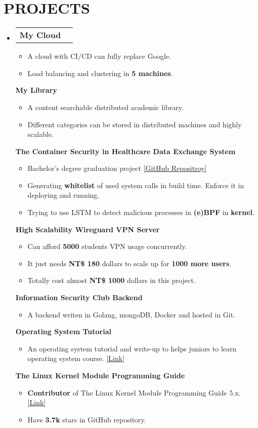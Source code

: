 \documentclass[letterpaper,11pt]{article}
\makeatletter
\newcommand{\resumeItem}[1]{
  \item\small{
    {#1 \vspace{-1pt}}
  }
}
\newcommand{\resumeProjectHeading}[2]{
    \item
    \begin{tabular*}{\textwidth}{l@{\extracolsep{\fill}}r}
      #1 & {\color{dark-grey}} \\
    \end{tabular*}\vspace{-4pt}
}
\newcommand{\resumeSubHeadingListStart}{\begin{itemize}[leftmargin=0in, label={}]}
\newcommand{\resumeSubHeadingListEnd}{\end{itemize}}
\newcommand{\resumeItemListStart}{\begin{itemize}}
\newcommand{\resumeItemListEnd}{\end{itemize}\vspace{0pt}}
\makeatother
\begin{document}

\section{PROJECTS}
\resumeSubHeadingListStart
\resumeProjectHeading

{\textbf{My Cloud}} {}
\resumeItemListStart
\resumeItem{A cloud with CI/CD can fully replace Google.}
\resumeItem{Load balancing and clustering in \textbf{5 machines}.}
\resumeItemListEnd

{\textbf{My Library}} {}
\resumeItemListStart
\resumeItem{A content searchable distributed academic library.}
\resumeItem{Different categories can be stored in distributed machines and highly scalable.}
\resumeItemListEnd

{\textbf{The Container Security in Healthcare Data Exchange System}} {}
\resumeItemListStart
\resumeItem{Bachelor’s degree graduation project \hspace{1pt} \href{https://github.com/25077667/Container_Security}{[GitHub Repositroy]}}
\resumeItem{Generating \textbf{whitelist} of used system calls in build time. Enforce it in deploying and running.}
\resumeItem{Trying to use LSTM to detect malicious processes in \textbf{(e)BPF} in \textbf{kernel}.}
\resumeItemListEnd

{\textbf{High Scalability Wireguard VPN Server}} {}
\resumeItemListStart
\resumeItem{Can afford \textbf{5000} students VPN usage concurrently.}
\resumeItem{It just needs \textbf{NT\$ 180} dollars to scale up for \textbf{1000 more users}. }
\resumeItem{Totally cost almost \textbf{NT\$ 1000} dollars in this project.}
\resumeItemListEnd

{\textbf{Information Security Club Backend}} {}
\resumeItemListStart
\resumeItem{A backend writen in Golang, mongoDB, Docker and hosted in Git. }
\resumeItemListEnd

{\textbf{Operating System Tutorial}} {}
\resumeItemListStart
\resumeItem{An operating system tutorial and write-up to helps juniors to learn operating system course. \href{https://hackmd.io/@25077667/os-hw}{[Link]} }
\resumeItemListEnd

{\textbf{The Linux Kernel Module Programming Guide}} {}
\resumeItemListStart
\resumeItem{\textbf{Contributor} of The Linux Kernel Module Programming Guide 5.x. \href{https://github.com/sysprog21/lkmpg}{[Link]}}
\resumeItem{Have \textbf{3.7k} stars in GitHub repository.}
\resumeItemListEnd

\resumeSubHeadingListEnd


\end{document}
